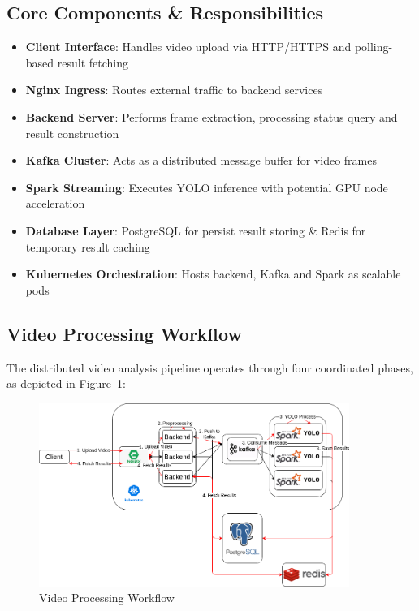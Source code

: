 \documentclass[10pt,a4paper]{article}
\begin{document}
\subsection{Core Components \& Responsibilities}
\begin{itemize}
    \item \textbf{Client Interface}: Handles video upload via HTTP/HTTPS and polling-based result fetching
    \item \textbf{Nginx Ingress}: Routes external traffic to backend services
    \item \textbf{Backend Server}: Performs frame extraction, processing status query and result construction
    \item \textbf{Kafka Cluster}: Acts as a distributed message buffer for video frames
    \item \textbf{Spark Streaming}: Executes YOLO inference with potential GPU node acceleration
    \item \textbf{Database Layer}: PostgreSQL for persist result storing \& Redis for temporary result caching
    \item \textbf{Kubernetes Orchestration}: Hosts backend, Kafka and Spark as scalable pods
\end{itemize}

\subsection{Video Processing Workflow}
The distributed video analysis pipeline operates through four coordinated phases, as depicted in Figure~\ref{fig:workflow}:

\begin{figure}[htbp]
    \centering
    \includegraphics[width=0.9\textwidth]{workflow.png}
    \caption{Video Processing Workflow}
    \label{fig:workflow}
\end{figure}
\end{document}
